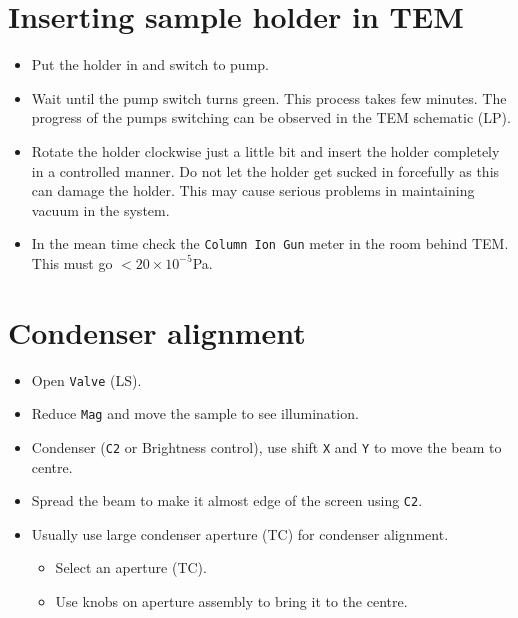 \documentclass[letterpaper,12pt]{article}
\begin{document}
\section{Inserting sample holder in TEM}
\begin{itemize}
\item Put the holder in and switch to pump.
\item Wait until the pump switch turns green. This process takes few minutes. The progress of the pumps switching can be observed in the TEM schematic (LP\footnotemark[1]).
\item Rotate the holder clockwise just a little bit and insert the holder completely in a controlled manner. Do not let the holder get sucked in  forcefully as this can damage the holder. This may cause serious problems in maintaining vacuum in the system.
\item In the mean time check the \texttt{Column Ion Gun} meter in the room behind TEM. This must go $<20\times10^{-5}$Pa.
\end{itemize}

\section{Condenser alignment}
\begin{itemize}
\item Open \texttt{Valve} (LS\footnotemark[1]).
\item Reduce \texttt{Mag} and move the sample to see illumination.
\item Condenser (\texttt{C2} or Brightness control), use shift \texttt{X} and \texttt{Y} to move the beam to centre.
\item Spread the beam to make it almost edge of the screen using \texttt{C2}.
\item Usually use large condenser aperture (TC\footnotemark[1]) for condenser alignment.
	\begin{itemize}
	\item Select an aperture (TC\footnotemark[1]).
	\item Use knobs on aperture assembly to bring it to the centre.
	\end{itemize}
\end{itemize}
\end{document}
